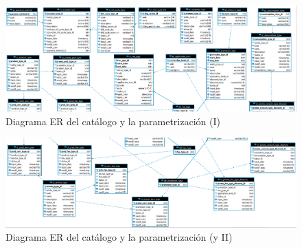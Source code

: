 \begin{landscape}

\begin{figure}[hp!]
  \centering
  \includegraphics[width=1\textwidth]{imaxes/er-catalogo-01.png}          	  \caption{Diagrama ER del catálogo y la parametrización (I)}
  \label{fig:er-catalogo-01}
\end{figure}

\begin{figure}[hp!]
  \centering
  \includegraphics[width=1\textwidth]{imaxes/er-catalogo-02.png}
  \caption{Diagrama ER del catálogo y la parametrización (y II)}
  \label{fig:er-catalogo-02}
\end{figure}


\end{landscape}

